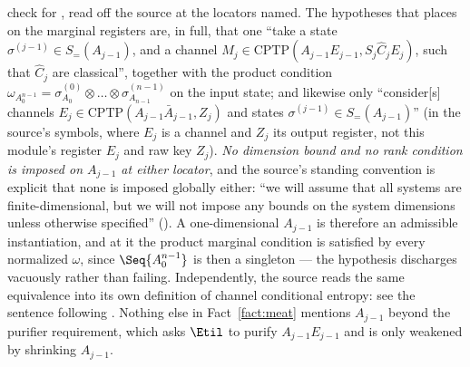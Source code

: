 \begin{fact}
check for , read off the source at the
locators named. The hypotheses that
\cite[Thm.~4.2a]{arqand2025meat} places on the marginal registers are,
in full, that one ``take a state $\sigma^{(j-1)}\in S_=(A_{j-1})$, and
a channel $M_j\in\mathrm{CPTP}(A_{j-1}E_{j-1},S_j\widehat C_jE_j)$,
such that $\widehat C_j$ are classical'', together with the product
condition
$\omega_{A_0^{n-1}}=\sigma^{(0)}_{A_0}\otimes\dots\otimes
\sigma^{(n-1)}_{A_{n-1}}$ on the input state; and
\cite[Def.~4.2, Eq.~(98)]{arqand2025meat} likewise only ``consider[s]
channels $E_j\in\mathrm{CPTP}(A_{j-1}\bar A_{j-1},Z_j)$ and states
$\sigma^{(j-1)}\in S_=(A_{j-1})$'' (in the source's symbols, where $E_j$ is a
channel and $Z_j$ its output register, not this module's register $E_j$ and
raw key $Z_j$). \emph{No dimension bound and no
rank condition is imposed on $A_{j-1}$ at either locator}, and the
source's standing convention is explicit that none is imposed globally
either: ``we will assume that all systems are finite-dimensional, but
we will not impose any bounds on the system dimensions unless otherwise
specified'' (\cite[Sec.~2, the convention stated below its Table~1]%
{arqand2025meat}). A one-dimensional $A_{j-1}$ is therefore an
admissible instantiation, and at it the product marginal condition is
satisfied by every normalized $\omega$, since $\Seq{A_0^{n-1}}$ is then
a singleton --- the hypothesis discharges vacuously rather than
failing. Independently, the source reads the same equivalence into its
own definition of channel conditional entropy: see the sentence
following \cite[Eq.~(1)]{arqand2025meat}. Nothing else in Fact~\ref{fact:meat}
mentions $A_{j-1}$ beyond the purifier requirement, which asks $\Etil$
to purify $A_{j-1}E_{j-1}$ and is only weakened by shrinking
$A_{j-1}$.
\end{fact}
